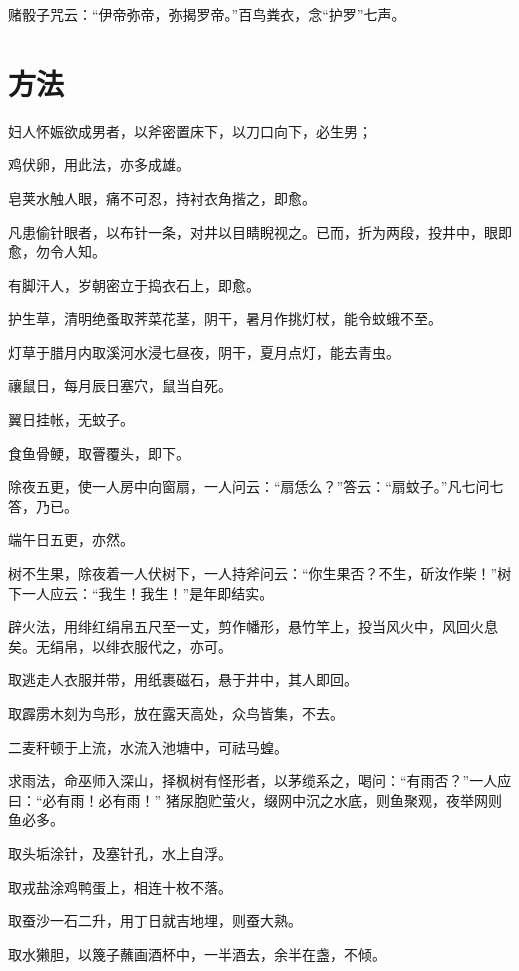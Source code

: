 \documentclass[a4paper,12pt,UTF8,twoside]{ctexbook}
\begin{document}
    赌骰子咒云：“伊帝弥帝，弥揭罗帝。”百鸟粪衣，念“护罗”七声。
    
    \chapter{方法}
    
    妇人怀娠欲成男者，以斧密置床下，以刀口向下，必生男；
    
    鸡伏卵，用此法，亦多成雄。
    
    皂荚水触人眼，痛不可忍，持衬衣角揩之，即愈。
    
    凡患偷针眼者，以布针一条，对井以目睛睨视之。已而，折为两段，投井中，眼即愈，勿令人知。
    
    有脚汗人，岁朝密立于捣衣石上，即愈。
    
    护生草，清明绝蚤取荠菜花茎，阴干，暑月作挑灯杖，能令蚊蛾不至。
    
    灯草于腊月内取溪河水浸七昼夜，阴干，夏月点灯，能去青虫。
    
    禳鼠日，每月辰日塞穴，鼠当自死。
    
    翼日挂帐，无蚊子。
    
    食鱼骨鲠，取罾覆头，即下。
    
    除夜五更，使一人房中向窗扇，一人问云：“扇恁么？”答云：“扇蚊子。”凡七问七答，乃已。
    
    端午日五更，亦然。
    
    树不生果，除夜着一人伏树下，一人持斧问云：“你生果否？不生，斫汝作柴！”树下一人应云：“我生！我生！”是年即结实。
    
    辟火法，用绯红绢帛五尺至一丈，剪作幡形，悬竹竿上，投当风火中，风回火息矣。无绢帛，以绯衣服代之，亦可。
    
    取逃走人衣服并带，用纸裹磁石，悬于井中，其人即回。
    
    取霹雳木刻为鸟形，放在露天高处，众鸟皆集，不去。
    
    二麦秆顿于上流，水流入池塘中，可祛马蝗。
    
    求雨法，命巫师入深山，择枫树有怪形者，以茅缆系之，喝问：“有雨否？”一人应曰：“必有雨！必有雨！” 猪尿胞贮萤火，缀网中沉之水底，则鱼聚观，夜举网则鱼必多。
    
    取头垢涂针，及塞针孔，水上自浮。
    
    取戎盐涂鸡鸭蛋上，相连十枚不落。
    
    取蚕沙一石二升，用丁日就吉地埋，则蚕大熟。
    
    取水獭胆，以篾子蘸画酒杯中，一半酒去，余半在盏，不倾。
    
\end{document}
